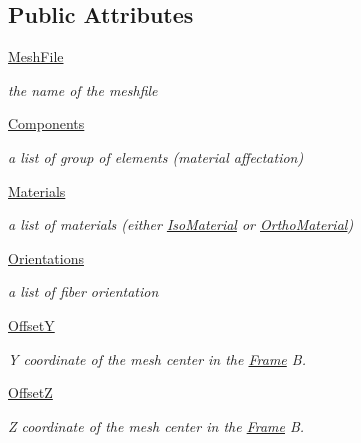 \subsection*{Public Attributes}
\begin{DoxyCompactItemize}
\item 
\hyperlink{classgebtaero_1_1_external_mesh_1_1_external_mesh_a53b38c75b026fb6c56b50b2dd9b5270f}{Mesh\+File}
\begin{DoxyCompactList}\small\item\em the name of the meshfile \end{DoxyCompactList}\item 
\hyperlink{classgebtaero_1_1_external_mesh_1_1_external_mesh_a592c0deea81b1ba0e686add0943889b4}{Components}
\begin{DoxyCompactList}\small\item\em a list of group of elements (material affectation) \end{DoxyCompactList}\item 
\hyperlink{classgebtaero_1_1_external_mesh_1_1_external_mesh_a60dc1666f258188383bc1a172bb3d219}{Materials}
\begin{DoxyCompactList}\small\item\em a list of materials (either \hyperlink{namespacegebtaero_1_1_iso_material}{Iso\+Material} or \hyperlink{namespacegebtaero_1_1_ortho_material}{Ortho\+Material}) \end{DoxyCompactList}\item 
\hyperlink{classgebtaero_1_1_external_mesh_1_1_external_mesh_a531dc1641becd6ea9cc5225ddfea8752}{Orientations}
\begin{DoxyCompactList}\small\item\em a list of fiber orientation \end{DoxyCompactList}\item 
\hyperlink{classgebtaero_1_1_external_mesh_1_1_external_mesh_a87faefe634a474727d516e58eb8bf944}{OffsetY}
\begin{DoxyCompactList}\small\item\em Y coordinate of the mesh center in the \hyperlink{namespacegebtaero_1_1_frame}{Frame} B. \end{DoxyCompactList}\item 
\hyperlink{classgebtaero_1_1_external_mesh_1_1_external_mesh_a6639038ee73b225cf0d3ea1bd9c52783}{OffsetZ}
\begin{DoxyCompactList}\small\item\em Z coordinate of the mesh center in the \hyperlink{namespacegebtaero_1_1_frame}{Frame} B. \end{DoxyCompactList}\item 

\end{DoxyCompactItemize}
